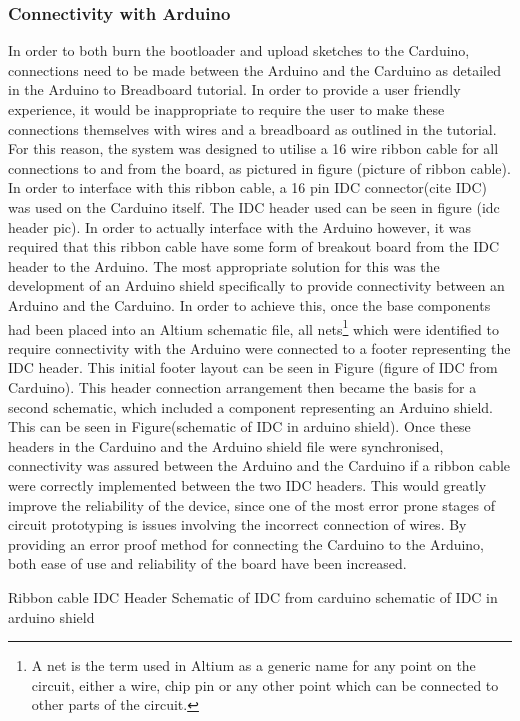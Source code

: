\subsubsection{Connectivity with Arduino}
In order to both burn the bootloader and upload sketches to the Carduino, connections need to be made between the Arduino and the Carduino as detailed in the Arduino to Breadboard tutorial\cite{ARDUINO_breadboard}. In order to provide a user friendly experience, it would be inappropriate to require the user to make these connections themselves with wires and a breadboard as outlined in the tutorial. For this reason, the system was designed to utilise a 16 wire ribbon cable for all connections to and from the board, as pictured in figure (picture of ribbon cable). In order to interface with this ribbon cable, a 16 pin IDC connector(cite IDC) was used on the Carduino itself. The IDC header used can be seen in figure (idc header pic). In order to actually interface with the Arduino however, it was required that this ribbon cable have some form of breakout board from the IDC header to the Arduino. The most appropriate solution for this was the development of an Arduino shield specifically to provide connectivity between an Arduino and the Carduino. In order to achieve this, once the base components had been placed into an Altium schematic file, all nets\footnote{A net is the term used in Altium as a generic name for any point on the circuit, either a wire, chip pin or any other point which can be connected to other parts of the circuit.} which were identified to require connectivity with the Arduino were connected to a footer representing the IDC header. This initial footer layout can be seen in Figure (figure of IDC from Carduino). This header connection arrangement then became the basis for a second schematic, which included a component representing an Arduino shield. This can be seen in Figure(schematic of IDC in arduino shield). Once these headers in the Carduino and the Arduino shield file were synchronised, connectivity was assured between the Arduino and the Carduino if a ribbon cable were correctly implemented between the two IDC headers. This would greatly improve the reliability of the device, since one of the most error prone stages of circuit prototyping is issues involving the incorrect connection of wires. By providing an error proof method for connecting the Carduino to the Arduino, both ease of use and reliability of the board have been increased.

Ribbon cable
IDC Header 
Schematic of IDC from carduino
schematic of IDC in arduino shield

